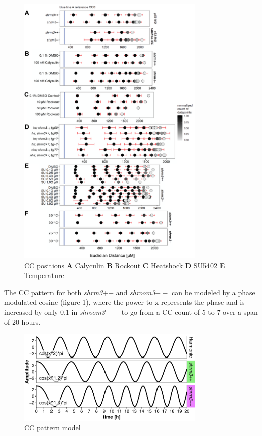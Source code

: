 \documentclass[11pt,singlespacinge,twoside]{reedthesis} %
\begin{document}
\begin{figure}

{\centering \includegraphics[width=0.8\textwidth]{figures/supp/cc_positions} 

}

\caption[Heatshock CC positions]{CC positions \textbf{A} Calyculin \textbf{B} Rockout \textbf{C} Heatshock \textbf{D} SU5402 \textbf{E} Temperature}\label{fig:supppos}
\end{figure}
The CC pattern for both \emph{shrm3}++ and \emph{shroom3}\(--\) can be modeled by a phase modulated cosine (figure 1), where the power to x represents the phase and is increased by only 0.1 in \emph{shroom3}\(--\) to go from a CC count of 5 to 7 over a span of 20 hours.


\begin{figure}

{\centering \includegraphics[width=0.8\textwidth]{figures/supp/cc_model} 

}

\caption[CC pattern model]{CC pattern model}\label{fig:supccpmodel}
\end{figure}
\end{document}
